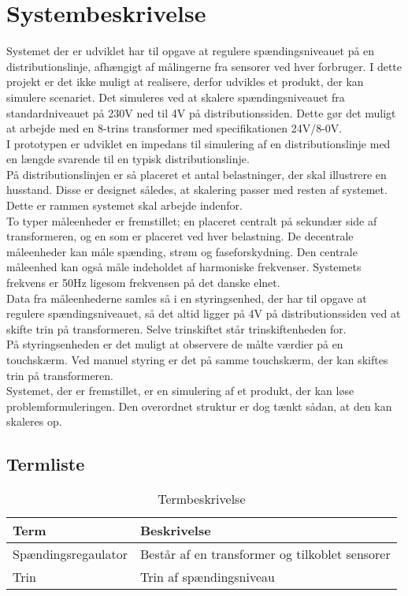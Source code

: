 
\section{Systembeskrivelse}

Systemet der er udviklet har til opgave at regulere spændingsniveauet på en distributionslinje, afhængigt af målingerne fra sensorer ved hver forbruger.
I dette projekt er det ikke muligt at realisere, derfor udvikles et produkt, der kan simulere scenariet. Det simuleres ved at skalere spændingsniveauet fra standardniveauet på 230V ned til 4V på distributionssiden. Dette gør det muligt at arbejde med en 8-trins transformer med specifikationen 24V/8-0V.\\
I prototypen er udviklet en impedans til simulering af en distributionslinje med en længde svarende til en typisk distributionslinje.\\
På distributionslinjen er så placeret et antal belastninger, der skal illustrere en husstand. Disse er designet således, at skalering passer med resten af systemet. Dette er rammen systemet skal arbejde indenfor. \\
To typer måleenheder er fremstillet; en placeret centralt på sekundær side af transformeren, og en som er placeret ved hver belastning. De decentrale måleenheder kan måle spænding, strøm og faseforskydning. Den centrale måleenhed kan også måle indeholdet af harmoniske frekvenser. Systemets frekvens er 50Hz ligesom frekvensen på det danske elnet.\\
Data fra måleenhederne samles så i en styringsenhed, der har til opgave at regulere spændingsniveauet, så det altid ligger på 4V på distributionssiden ved at skifte trin på transformeren. Selve trinskiftet står trinskiftenheden for.\\
På styringsenheden er det muligt at observere de målte værdier på en touchskærm. Ved manuel styring er det på samme touchskærm, der kan skiftes trin på transformeren.\\
Systemet, der er fremstillet, er en simulering af et produkt, der kan løse problemformuleringen. Den overordnet struktur er dog tænkt sådan, at den kan skaleres op.\\




\subsection{Termliste}

\begin{table}[htbp]
\centering
\begin{tabular}{|l|l|}
\hline
\textbf{Term} 	& \textbf{Beskrivelse} \\\hline
Spændingsregaulator	& Består af en transformer og tilkoblet sensorer \\\hline
Trin 	& Trin af spændingsniveau \\\hline

\end{tabular}
\caption{Termbeskrivelse}
\label{tab:termbeskrivelsen}

\end{table}